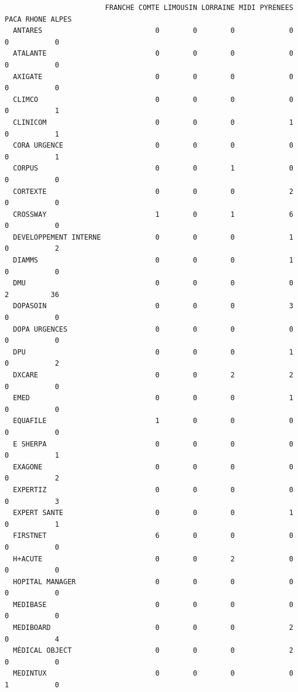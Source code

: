\documentclass[]{article}
\begin{document}
\begin{verbatim}
                        FRANCHE COMTE LIMOUSIN LORRAINE MIDI PYRENEES PACA RHONE ALPES
  ANTARES                           0        0        0             0    0           0
  ATALANTE                          0        0        0             0    0           0
  AXIGATE                           0        0        0             0    0           0
  CLIMCO                            0        0        0             0    0           1
  CLINICOM                          0        0        0             1    0           1
  CORA URGENCE                      0        0        0             0    0           1
  CORPUS                            0        0        1             0    0           0
  CORTEXTE                          0        0        0             2    0           0
  CROSSWAY                          1        0        1             6    0           0
  DEVELOPPEMENT INTERNE             0        0        0             1    0           2
  DIAMMS                            0        0        0             1    0           0
  DMU                               0        0        0             0    2          36
  DOPASOIN                          0        0        0             3    0           0
  DOPA URGENCES                     0        0        0             0    0           0
  DPU                               0        0        0             1    0           2
  DXCARE                            0        0        2             2    0           0
  EMED                              0        0        0             1    0           0
  EQUAFILE                          1        0        0             0    0           0
  E SHERPA                          0        0        0             0    0           1
  EXAGONE                           0        0        0             0    0           2
  EXPERTIZ                          0        0        0             0    0           3
  EXPERT SANTE                      0        0        0             1    0           1
  FIRSTNET                          6        0        0             0    0           0
  H+ACUTE                           0        0        2             0    0           0
  HOPITAL MANAGER                   0        0        0             0    0           0
  MEDIBASE                          0        0        0             0    0           0
  MEDIBOARD                         0        0        0             2    0           4
  MÉDICAL OBJECT                    0        0        0             2    0           0
  MEDINTUX                          0        0        0             0    1           0

\end{verbatim}
\end{document}

